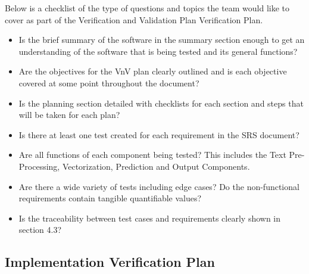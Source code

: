 \documentclass[12pt, titlepage]{article}
\begin{document}
  Below is a checklist of the type of questions and topics the team would like to cover as part of the Verification and Validation Plan Verification Plan.\\
  
  \begin{itemize}
  
  \item Is the brief summary of the software in the summary section enough to get an understanding of the software that is being tested and its general functions?
  \item Are the objectives for the VnV plan clearly outlined and is each objective covered at some point throughout the document?
  \item Is the planning section detailed with checklists for each section and steps that will be taken for each plan?
  \item Is there at least one test created for each requirement in the SRS document?
  \item Are all functions of each component being tested? This includes the Text Pre-Processing, Vectorization, Prediction and Output Components.
  \item Are there a wide variety of tests including edge cases?
  Do the non-functional requirements contain tangible quantifiable values?
  \item Is the traceability between test cases and requirements clearly shown in section 4.3?
  \end{itemize}
  
  
  \subsection{Implementation Verification Plan} \label{Implementation Verification Plan}
  
\end{document}
